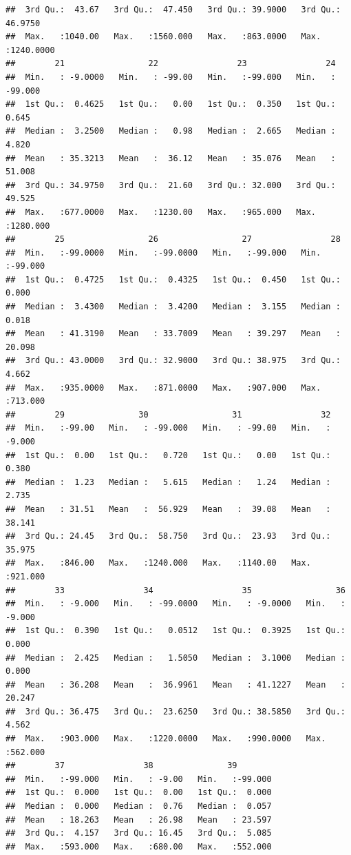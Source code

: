 \documentclass[
]{article}
\begin{document}
\begin{verbatim}
##  3rd Qu.:  43.67   3rd Qu.:  47.450   3rd Qu.: 39.9000   3rd Qu.:  46.9750  
##  Max.   :1040.00   Max.   :1560.000   Max.   :863.0000   Max.   :1240.0000  
##        21                 22                23                24          
##  Min.   : -9.0000   Min.   : -99.00   Min.   :-99.000   Min.   : -99.000  
##  1st Qu.:  0.4625   1st Qu.:   0.00   1st Qu.:  0.350   1st Qu.:   0.645  
##  Median :  3.2500   Median :   0.98   Median :  2.665   Median :   4.820  
##  Mean   : 35.3213   Mean   :  36.12   Mean   : 35.076   Mean   :  51.008  
##  3rd Qu.: 34.9750   3rd Qu.:  21.60   3rd Qu.: 32.000   3rd Qu.:  49.525  
##  Max.   :677.0000   Max.   :1230.00   Max.   :965.000   Max.   :1280.000  
##        25                 26                 27                28         
##  Min.   :-99.0000   Min.   :-99.0000   Min.   :-99.000   Min.   :-99.000  
##  1st Qu.:  0.4725   1st Qu.:  0.4325   1st Qu.:  0.450   1st Qu.:  0.000  
##  Median :  3.4300   Median :  3.4200   Median :  3.155   Median :  0.018  
##  Mean   : 41.3190   Mean   : 33.7009   Mean   : 39.297   Mean   : 20.098  
##  3rd Qu.: 43.0000   3rd Qu.: 32.9000   3rd Qu.: 38.975   3rd Qu.:  4.662  
##  Max.   :935.0000   Max.   :871.0000   Max.   :907.000   Max.   :713.000  
##        29               30                 31                32         
##  Min.   :-99.00   Min.   : -99.000   Min.   : -99.00   Min.   : -9.000  
##  1st Qu.:  0.00   1st Qu.:   0.720   1st Qu.:   0.00   1st Qu.:  0.380  
##  Median :  1.23   Median :   5.615   Median :   1.24   Median :  2.735  
##  Mean   : 31.51   Mean   :  56.929   Mean   :  39.08   Mean   : 38.141  
##  3rd Qu.: 24.45   3rd Qu.:  58.750   3rd Qu.:  23.93   3rd Qu.: 35.975  
##  Max.   :846.00   Max.   :1240.000   Max.   :1140.00   Max.   :921.000  
##        33                34                  35                 36         
##  Min.   : -9.000   Min.   : -99.0000   Min.   : -9.0000   Min.   : -9.000  
##  1st Qu.:  0.390   1st Qu.:   0.0512   1st Qu.:  0.3925   1st Qu.:  0.000  
##  Median :  2.425   Median :   1.5050   Median :  3.1000   Median :  0.000  
##  Mean   : 36.208   Mean   :  36.9961   Mean   : 41.1227   Mean   : 20.247  
##  3rd Qu.: 36.475   3rd Qu.:  23.6250   3rd Qu.: 38.5850   3rd Qu.:  4.562  
##  Max.   :903.000   Max.   :1220.0000   Max.   :990.0000   Max.   :562.000  
##        37                38               39         
##  Min.   :-99.000   Min.   : -9.00   Min.   :-99.000  
##  1st Qu.:  0.000   1st Qu.:  0.00   1st Qu.:  0.000  
##  Median :  0.000   Median :  0.76   Median :  0.057  
##  Mean   : 18.263   Mean   : 26.98   Mean   : 23.597  
##  3rd Qu.:  4.157   3rd Qu.: 16.45   3rd Qu.:  5.085  
##  Max.   :593.000   Max.   :680.00   Max.   :552.000
\end{verbatim}
\end{document}

